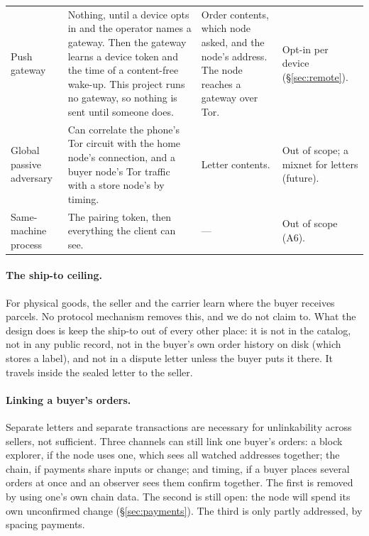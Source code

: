 {\begin{longtable}{@{}p{}p{}p{}p{}@{}}
Push gateway & Nothing, until a device opts in and the operator names a gateway. Then the gateway learns a device token and the time of a content-free wake-up. This project runs no gateway, so nothing is sent until someone does. & Order contents, which node asked, and the node's address. The node reaches a gateway over Tor. & Opt-in per device (\S\ref{sec:remote}). \\
Global passive adversary & Can correlate the phone's Tor circuit with the home node's connection, and a buyer node's Tor traffic with a store node's by timing. & Letter contents. & Out of scope; a mixnet for letters (future). \\
Same-machine process & The pairing token, then everything the client can see. & --- & Out of scope (A6). \\
\end{longtable}
}

\paragraph{The ship-to ceiling.} For physical goods, the seller and the carrier learn where the buyer receives parcels. No protocol mechanism removes this, and we do not claim to. What the design does is keep the ship-to out of every other place: it is not in the catalog, not in any public record, not in the buyer's own order history on disk (which stores a label), and not in a dispute letter unless the buyer puts it there. It travels inside the sealed letter to the seller.

\paragraph{Linking a buyer's orders.} Separate letters and separate transactions are necessary for unlinkability across sellers, not sufficient. Three channels can still link one buyer's orders: a block explorer, if the node uses one, which sees all watched addresses together; the chain, if payments share inputs or change; and timing, if a buyer places several orders at once and an observer sees them confirm together. The first is removed by using one's own chain data. The second is still open: the node will spend its own unconfirmed change (\S\ref{sec:payments}). The third is only partly addressed, by spacing payments.
